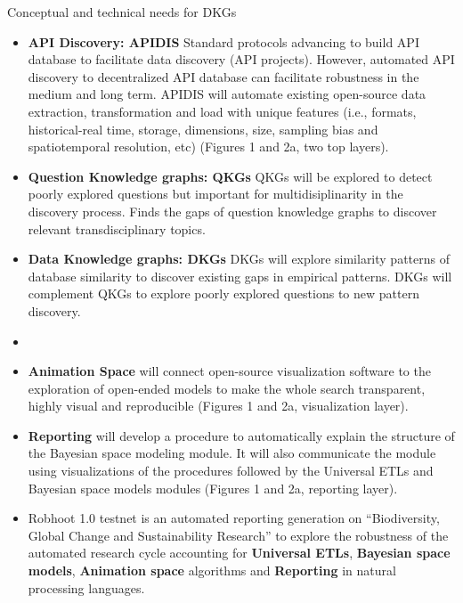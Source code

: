 \documentclass[12pt, a4paper]{article} %
\begin{document}
      Conceptual and technical needs for DKGs
 

  \begin{itemize}
    
  \item {\bf API Discovery: APIDIS} Standard protocols advancing to
    build API database to facilitate data discovery (API
    projects). However, automated API discovery to decentralized API
    database can facilitate robustness in the medium and long
    term. APIDIS will automate existing open-source data extraction,
    transformation and load with unique features (i.e., formats,
    historical-real time, storage, dimensions, size, sampling bias and
    spatiotemporal resolution, etc) (Figures 1 and 2a, two top
    layers).
  \item {\bf Question Knowledge graphs: QKGs} QKGs will be explored to
    detect poorly explored questions but important for
    multidisiplinarity in the discovery process. Finds the gaps of
    question knowledge graphs to discover relevant transdisciplinary
    topics.
  \item {\bf Data Knowledge graphs: DKGs} DKGs will explore similarity
    patterns of database similarity to discover existing gaps in
    empirical patterns. DKGs will complement QKGs to explore poorly
    explored questions to new pattern discovery.

  \item {\bf   }

  
   \item {\bf Animation Space} will connect open-source visualization
     software to the exploration of open-ended models to make the
     whole search transparent, highly visual and reproducible (Figures
     1 and 2a, visualization layer).
   \item {\bf Reporting} will develop a procedure to automatically
     explain the structure of the Bayesian space modeling module. It
     will also communicate the module using visualizations of the
     procedures followed by the Universal ETLs and Bayesian space
     models modules (Figures 1 and 2a, reporting layer).
   \item Robhoot 1.0 testnet is an automated reporting generation on
     ``Biodiversity, Global Change and Sustainability Research'' to
     explore the robustness of the automated research cycle accounting
     for {\bf Universal ETLs}, {\bf Bayesian space models}, {\bf
       Animation space} algorithms and {\bf Reporting} in natural
     processing languages.
   \end{itemize}
\end{document}
